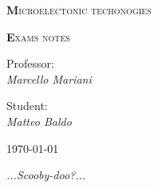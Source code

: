\begin{titlepage}

	\centering
	{\scshape\huge\textbf Microelectonic techonogies \par}
	{\scshape\huge\textbf Exams notes \par}	
	\vspace{13cm}
{Professor:\\ \textit{Marcello Mariani}}	

\vspace{0.5cm}

{Student:\\ \textit{Matteo Baldo}}

\vspace{2cm}
	\vfill
	\raggedleft
	{\today\par}
	
\vspace{1cm}
\raggedright
{ \it ...Scooby-doo?...}
\end{titlepage}
        \newpage
		\setcounter{page}{2}
        \null 
        \thispagestyle{empty} 
        \newpage  


\tableofcontents





